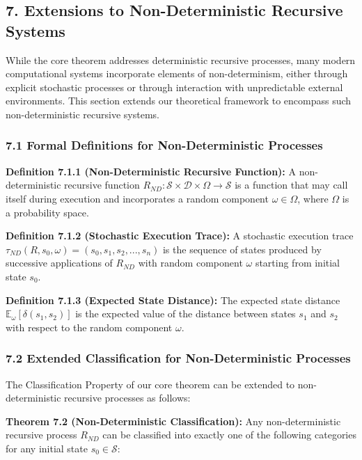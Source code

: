 \documentclass[
]{article}
\begin{document}
\subsection{7. Extensions to Non-Deterministic Recursive
Systems}\label{extensions-to-non-deterministic-recursive-systems}

While the core theorem addresses deterministic recursive processes, many
modern computational systems incorporate elements of non-determinism,
either through explicit stochastic processes or through interaction with
unpredictable external environments. This section extends our
theoretical framework to encompass such non-deterministic recursive
systems.

\subsubsection{7.1 Formal Definitions for Non-Deterministic
Processes}\label{formal-definitions-for-non-deterministic-processes}

\textbf{Definition 7.1.1 (Non-Deterministic Recursive Function):} A
non-deterministic recursive function
\(R_{ND}: \mathcal{S} \times \mathcal{D} \times \Omega \rightarrow \mathcal{S}\)
is a function that may call itself during execution and incorporates a
random component \(\omega \in \Omega\), where \(\Omega\) is a
probability space.

\textbf{Definition 7.1.2 (Stochastic Execution Trace):} A stochastic
execution trace
\(\tau_{ND}(R, s_0, \omega) = (s_0, s_1, s_2, ..., s_n)\) is the
sequence of states produced by successive applications of \(R_{ND}\)
with random component \(\omega\) starting from initial state \(s_0\).

\textbf{Definition 7.1.3 (Expected State Distance):} The expected state
distance \(\mathbb{E}_{\omega}[\delta(s_1, s_2)]\) is the expected value
of the distance between states \(s_1\) and \(s_2\) with respect to the
random component \(\omega\).

\subsubsection{7.2 Extended Classification for Non-Deterministic
Processes}\label{extended-classification-for-non-deterministic-processes}

The Classification Property of our core theorem can be extended to
non-deterministic recursive processes as follows:

\textbf{Theorem 7.2 (Non-Deterministic Classification):} Any
non-deterministic recursive process \(R_{ND}\) can be classified into
exactly one of the following categories for any initial state
\(s_0 \in \mathcal{S}\):
\end{document}
